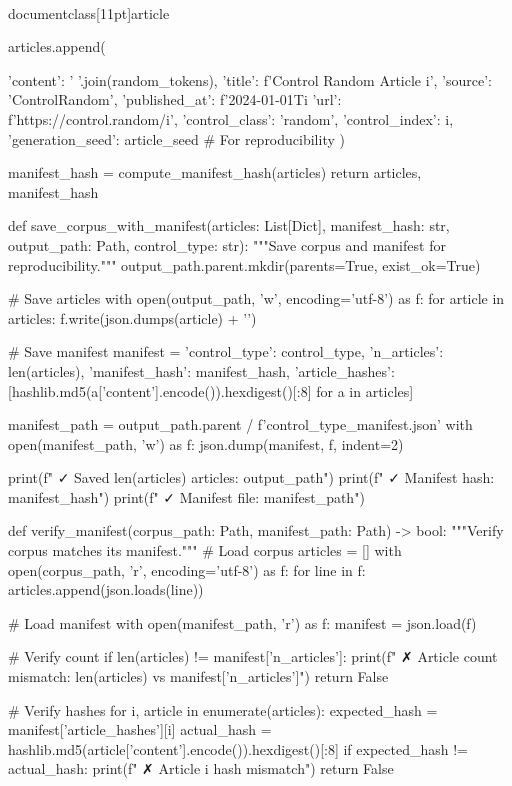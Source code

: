 \\documentclass[11pt]{article}
\begin{document}
\begin{CodeBlock}
{{        articles.append({
            'content': ' '.join(random_tokens),
            'title': f'Control Random Article {i}',
            'source': 'ControlRandom',
            'published_at': f'2024-01-01T{i%
            'url': f'https://control.random/{i}',
            'control_class': 'random',
            'control_index': i,
            'generation_seed': article_seed  # For reproducibility
        })
    
    manifest_hash = compute_manifest_hash(articles)
    return articles, manifest_hash


def save_corpus_with_manifest(articles: List[Dict], manifest_hash: str, 
                               output_path: Path, control_type: str):
    """Save corpus and manifest for reproducibility."""
    output_path.parent.mkdir(parents=True, exist_ok=True)
    
    # Save articles
    with open(output_path, 'w', encoding='utf-8') as f:
        for article in articles:
            f.write(json.dumps(article) + '\n')
    
    # Save manifest
    manifest = {
        'control_type': control_type,
        'n_articles': len(articles),
        'manifest_hash': manifest_hash,
        'article_hashes': [hashlib.md5(a['content'].encode()).hexdigest()[:8] 
                          for a in articles]
    }
    
    manifest_path = output_path.parent / f'{control_type}_manifest.json'
    with open(manifest_path, 'w') as f:
        json.dump(manifest, f, indent=2)
    
    print(f"  ✓ Saved {len(articles)} articles: {output_path}")
    print(f"  ✓ Manifest hash: {manifest_hash}")
    print(f"  ✓ Manifest file: {manifest_path}")


def verify_manifest(corpus_path: Path, manifest_path: Path) -> bool:
    """Verify corpus matches its manifest."""
    # Load corpus
    articles = []
    with open(corpus_path, 'r', encoding='utf-8') as f:
        for line in f:
            articles.append(json.loads(line))
    
    # Load manifest
    with open(manifest_path, 'r') as f:
        manifest = json.load(f)
    
    # Verify count
    if len(articles) != manifest['n_articles']:
        print(f"  ✗ Article count mismatch: {len(articles)} vs {manifest['n_articles']}")
        return False
    
    # Verify hashes
    for i, article in enumerate(articles):
        expected_hash = manifest['article_hashes'][i]
        actual_hash = hashlib.md5(article['content'].encode()).hexdigest()[:8]
        if expected_hash != actual_hash:
            print(f"  ✗ Article {i} hash mismatch")
            return False
    
}}}
\end{CodeBlock}
\end{document}
